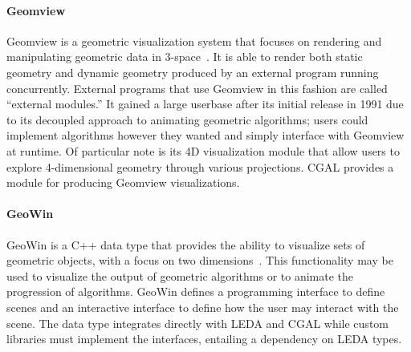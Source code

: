 % 
% 
% 
% 

\paragraph{Geomview}

Geomview is a geometric visualization system that focuses on rendering and
manipulating geometric data in 3-space~\cite{phillips1993geomview,
hanson1994interactive, amenta1995geomview}. It is able to render both static
geometry and dynamic geometry produced by an external program running
concurrently. External programs that use Geomview in this fashion are called
``external modules.'' It gained a large userbase after its initial release in 1991
due to its decoupled approach to animating geometric algorithms; users could
implement algorithms however they wanted and simply interface with Geomview at
runtime. Of particular note is its 4D visualization module that allow users to
explore 4-dimensional geometry through various projections. CGAL provides a
module for producing Geomview visualizations.

\paragraph{GeoWin}

GeoWin is a C++ data type that provides the ability to visualize sets of
geometric objects, with a focus on two dimensions~\cite{basken2002geowin}. This
functionality may be used to visualize the output of geometric algorithms or to
animate the progression of algorithms. GeoWin defines a programming interface to
define scenes and an interactive interface to define how the user may interact
with the scene. The data type integrates directly with LEDA and CGAL while
custom libraries must implement the interfaces, entailing a dependency on LEDA
types.

